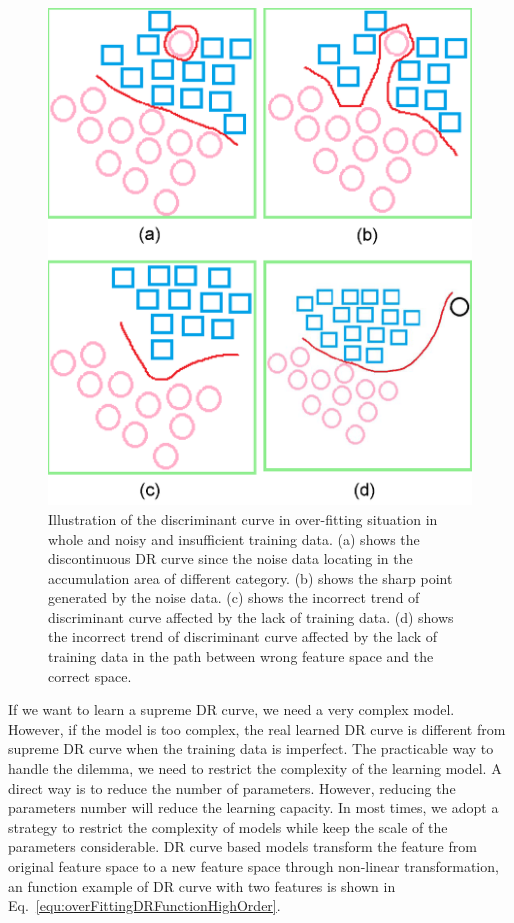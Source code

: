 \documentclass[runningheads,openany]{xhlPaper}
\begin{document}
\begin{figure}
\centering
\includegraphics[width=1.0\linewidth]{overFittingWrongDiscriminantCurve}
\caption{Illustration of the discriminant curve in over-fitting situation in whole and noisy and insufficient training data. (a) shows the discontinuous DR curve since the noise data locating in the accumulation area of different category. (b) shows the sharp point generated by the noise data. (c) shows the incorrect trend of discriminant curve affected by the lack of training data. (d) shows the incorrect trend of discriminant curve affected by the lack of training data in the path between wrong feature space and the correct space.}
\label{fig:overFittingWrongDiscriminantCurve}
\end{figure}

If we want to learn a supreme DR curve, we need a very complex model. 
However, if the model is too complex, the real learned DR curve is different from supreme DR curve when the training data is imperfect.
The practicable way to handle the dilemma, we need to restrict the complexity of the learning model.
A direct way is to reduce the number of parameters. However, reducing the parameters number will reduce the learning capacity. 
In most times, we adopt a strategy to restrict the complexity of models while keep the scale of the parameters considerable.
DR curve based models transform the feature from original feature space to a new feature space through non-linear transformation, an function example of DR curve with two features is shown in Eq.~\ref{equ:overFittingDRFunctionHighOrder}. 
\end{document}
